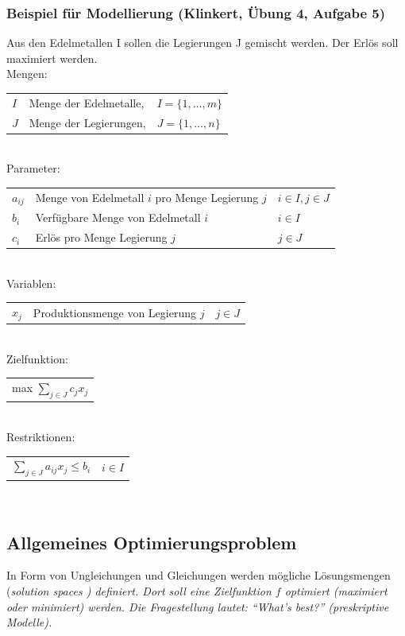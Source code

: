   \subsubsection{Beispiel für Modellierung (Klinkert, Übung 4, Aufgabe 5)}
  Aus den Edelmetallen I sollen die Legierungen J gemischt werden. Der Erlös soll maximiert werden.\\
  Mengen:\\
  \begin{tabular}{lll}
    $I$ & Menge der Edelmetalle, &$I = \{1, \ldots, m\}$\\
    $J$ & Menge der Legierungen, &$J = \{1, \ldots, n\}$
  \end{tabular}\\
  Parameter:\\
  \begin{tabular}{lll}
    $a_{ij}$ & Menge von Edelmetall $i$ pro Menge Legierung $j$ & $i \in I, j \in J$\\
    $b_i$    & Verfügbare Menge von Edelmetall $i$              & $i \in I$\\
    $c_i$    & Erlös pro Menge Legierung $j$                    & $j \in J$\\
  \end{tabular}\\
  Variablen:\\
  \begin{tabular}{lll}
    $x_j$ & Produktionsmenge von Legierung $j$ & $j \in J$\\
  \end{tabular}\\
  Zielfunktion:\\
  \begin{tabular}{l}
    max $\sum_{j \in J}c_j x_j$\\
  \end{tabular}\\
  Restriktionen:\\
  \begin{tabular}{ll}
    $\sum_{j \in J}a_{ij}x_j \le b_i$ & $i \in I$
  \end{tabular}\\




\subsection{Allgemeines Optimierungsproblem }
  In Form von Ungleichungen und Gleichungen werden mögliche Lösungsmengen (\em solution spaces \em) definiert. Dort soll eine Zielfunktion $f$ optimiert (maximiert oder minimiert) werden. Die Fragestellung lautet: "`What's best?"' (preskriptive Modelle).
  
